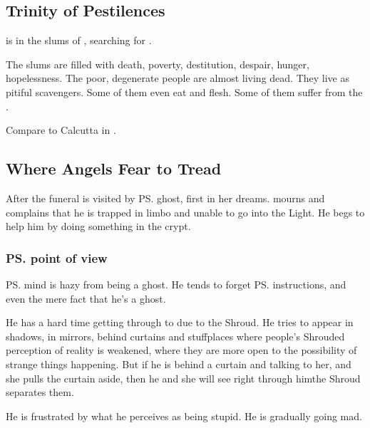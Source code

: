 \subsection{Trinity of Pestilences}
 is in the slums of \Malcur, searching for . 

The slums are filled with death, poverty, destitution, despair, hunger, hopelessness. 
The poor, degenerate people are almost living dead. 
They live as pitiful scavengers. 
Some of them even eat \human{} and \scathaese{} flesh. 
Some of them suffer from the . 

Compare to Calcutta in \cite{PoppyZBrite:CalcuttaLordofNerves}. 







\subsection{Where Angels Fear to Tread}
After the funeral \Tiroco{} is visited by \ps{\Icor} ghost, first in her dreams. 
\Icor{} mourns and complains that he is trapped in limbo and unable to go into the Light. He begs \Tiroco{} to help him by doing something in the crypt.






\subsubsection{\ps{\Icor} point of view}
\ps{\Icor} mind is hazy from being a ghost. 
He tends to forget \ps{\Psyrex}{} instructions, and even the mere fact that he's a ghost.

He has a hard time getting through to \Tiroco{} due to the Shroud. 
He tries to appear in shadows, in mirrors, behind curtains and stuff\dash places where people's Shrouded perception of reality is weakened, where they are more open to the possibility of strange things happening. 
But if he is behind a curtain and talking to her, and she pulls the curtain aside, then he  and she will see right through him\dash the Shroud separates them. 

He is frustrated by what he perceives as \Tiroco{} being stupid. 
He is gradually going mad. 

